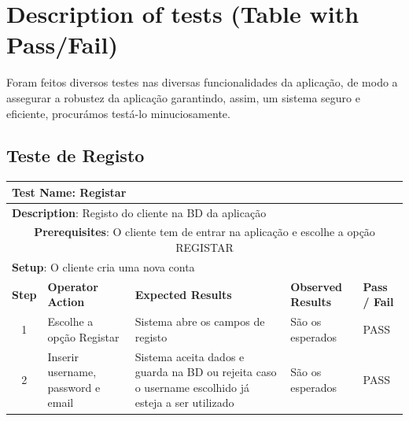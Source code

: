 \documentclass[12pt]{article} %
\begin{document}
\pagebreak
\section{Description of tests (Table with Pass/Fail)} %
\label{sec:Tests}
Foram feitos diversos testes nas diversas funcionalidades da aplicação, de modo a assegurar a robustez da aplicação garantindo, assim, um sistema seguro e eficiente, procurámos testá-lo minuciosamente.

\subsection{Teste de Registo}
\begin{table}[ht!]
	\begin{tabular}{|c|p{4cm}|p{4cm}|p{3cm}|p{1cm}|}
		\hline
		\multicolumn{5}{|l|}{\textbf{Test Name}: Registar}\\
		\hline
		\multicolumn{5}{|l|}{\textbf{Description}: Registo do cliente na BD da aplicação}\\
		\hline
		\multicolumn{5}{|p{14,5cm}|}{\textbf{Prerequisites}: O cliente tem de entrar na aplicação e escolhe a opção REGISTAR}\\
		\hline
		\multicolumn{5}{|l|}{\textbf{Setup}: O cliente cria uma nova conta}\\
		\hline
		\textbf{Step} & \textbf{Operator Action} & \textbf{Expected Results} & \textbf{Observed Results} & \textbf{Pass / Fail}\\
		\hline
		1 & Escolhe a opção Registar & Sistema abre os campos de registo & São os esperados & PASS\\
		\hline
		2 & Inserir username, password e email & Sistema aceita dados e guarda na BD ou rejeita caso o username escolhido já esteja a ser utilizado & São os esperados & PASS\\
		\hline
	\end{tabular}
\end{table}
\pagebreak


\end{document}
